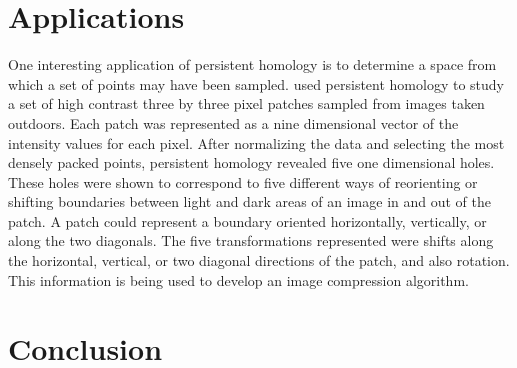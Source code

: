 \section{Applications}\label{sec:applications}

One interesting application of persistent homology is to determine a space from which a set of points may have been sampled. \citet{carlssonb} used persistent homology to study a set of high contrast three by three pixel patches sampled from images taken outdoors. Each patch was represented as a nine dimensional vector of the intensity values for each pixel. After normalizing the data and selecting the most densely packed points, persistent homology revealed five one dimensional holes. These holes were shown to correspond to five different ways of reorienting or shifting boundaries between light and dark areas of an image in and out of the patch. A patch could represent a boundary oriented horizontally, vertically, or along the two diagonals. The five transformations represented were shifts along the horizontal, vertical, or two diagonal directions of the patch, and also rotation. This information is being used to develop an image compression algorithm.



\section{Conclusion}\label{sec:conclusion}


\lightgray{

\nocite{aktas}



\nocite{cohen-steiner}

}




% 




